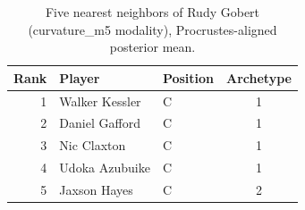 \begin{table}[htbp]
  \centering\small
  \begin{tabular}{rllc}
    \toprule
    Rank & Player & Position & Archetype \\
    \midrule
    1 & Walker Kessler & C & 1 \\
    2 & Daniel Gafford & C & 1 \\
    3 & Nic Claxton & C & 1 \\
    4 & Udoka Azubuike & C & 1 \\
    5 & Jaxson Hayes & C & 2 \\
    \bottomrule
  \end{tabular}
  \caption{Five nearest neighbors of Rudy Gobert (curvature_m5 modality), Procrustes-aligned posterior mean.}
  \label{tab:Rudy_Gobert_neighbors_curvature_m5}
\end{table}

